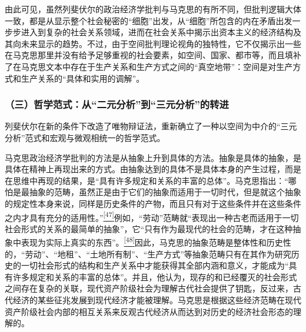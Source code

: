 \documentclass[UTF8, fontset = sourcesans, a4paper, oneside, zihao =
-4, scheme=chinese, no-math, space=true]{ctexbook}
\begin{document}
由此可见，虽然列斐伏尔的政治经济学批判与马克思的有所不同，但批判逻辑大体一致，都是从显示整个社会秘密的``细胞''出发，从``细胞''所包含的内在矛盾出发一步步进入到复杂的社会关系领域，进而在社会关系中揭示出资本主义的经济结构及其向未来显示的趋势。不过，由于空间批判理论视角的独特性，它不仅揭示出一些在马克思那里并没有给予足够重视的社会要素，如空间、国家、都市等，而且填补了在马克思文本中存在于生产关系和生产方式之间的``真空地带''：空间是对生产方式和生产关系的``具体和实用的调解''。

\subsubsection{\texorpdfstring{（三）哲学范式：从``二元分析''到``三元分析''的转进}{（三）哲学范式：从二元分析到三元分析的转进}}\label{part0010_split_002.htmlux5cux23d041}

列斐伏尔在新的条件下改造了唯物辩证法，重新确立了一种以空间为中介的``三元分析''范式和宏观与微观相统一的哲学范式。

马克思政治经济学批判的方法是从抽象上升到具体的方法。抽象是具体的抽象，是具体在精神上再现出来的方式。由抽象达到的具体不是具体本身的产生过程，而是在思维中再现的结果，是``具有许多规定和关系的丰富的总体''。马克思指出：``哪怕是最抽象的范畴，虽然正是由于它们的抽象而适用于一切时代，但是就这个抽象的规定性本身来说，同样是历史条件的产物，而且只有对于这些条件并在这些条件之内才具有充分的适用性。''\protect\hypertarget{part0010_split_002.htmlux5cux23w47}{}{}\protect\hyperlink{part0010_split_002.htmlux5cux23m47}{\textsuperscript{{[}47{]}}}例如，``劳动''范畴就``表现出一种古老而适用于一切社会形式的关系的最简单的抽象''，它``只有作为最现代的社会的范畴，才在这种抽象中表现为实际上真实的东西''。\protect\hypertarget{part0010_split_002.htmlux5cux23w48}{}{}\protect\hyperlink{part0010_split_002.htmlux5cux23m48}{\textsuperscript{{[}48{]}}}因此，马克思的抽象范畴是整体性和历史性的，``劳动''、``地租''、``土地所有制''、``生产方式''等抽象范畴只有在其作为研究历史的一切社会形式的结构和生产关系中才能获得其全部内涵和意义，才能成为``具有许多规定和关系的丰富的总体''。并且，他认为，现存的和已经覆灭的社会形式之间存在复杂的关联，现代资产阶级社会为理解古代社会提供了钥匙，反过来，古代经济的某些征兆发展到现代经济才能被理解。马克思是根据这些经济范畴在现代资产阶级社会内部的相互关系来反观古代经济从而达到对历史的经济社会形态的理解的。
\end{document}
